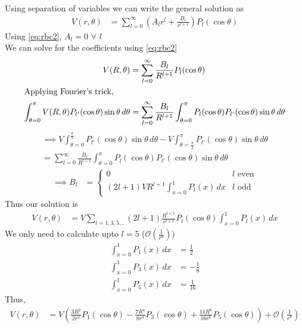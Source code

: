 \documentclass[../main.tex]{subfiles}
\begin{document}
\begin{questions}
\begin{solution}
		Using separation of variables we can write the general solution as
		\begin{align}
			V(r,\theta) &= \sum_{l=0}^{\infty} \left(A_l r^l + \frac{B_l}{r^{l+1}}\right)P_l(\cos\theta)
		\end{align}
		Using \eqref{eq:rbc2}, $A_l = 0$ $\forall$ $l$\\
		We can solve for the coefficients using \eqref{eq:rbc2}
		\begin{align}
			V(R,\theta) &= \sum_{l=0}^{\infty} \frac{B_l}{R^{l+1}}P_l(\cos\theta)\\
			\intertext{Applying Fourier's trick,}
			\int_{\theta=0}^{\pi} V(R,\theta)P_{l'}(\cos\theta)\sin\theta\,d\theta &= \sum_{l=0}^{\infty} \frac{B_l}{R^{l+1}} \int_{\theta=0}^{\pi} P_l(\cos\theta)P_{l'}(\cos\theta)\sin\theta\,d\theta
		\end{align}
		\begin{align}
			\implies V\int_{\theta=0}^{\frac{\pi}{2}} P_{l'}(\cos\theta)\sin\theta\,d\theta - V\int_{\theta=\frac{\pi}{2}}^{\pi} P_{l'}(\cos\theta)\sin\theta\,d\theta \\
			= \sum_{l=0}^{\infty} \frac{B_l}{R^{l+1}} \int_{\theta=0}^{\pi} P_l(\cos\theta)P_{l'}(\cos\theta)\sin\theta\,d\theta
		\end{align}
		\begin{align}
			\implies B_l &=
			\begin{cases}
				0 & l \text{ even}\\
				(2l+1)VR^{l+1} \int_{x=0}^{1}P_l(x)\,dx & l \text{ odd}
			\end{cases}
		\end{align}
		Thus our solution is
		\begin{align}
			V(r,\theta) &= V\sum_{l=1,3,5\dots} (2l+1)\frac{R^{l+1}}{r^{l+1}} P_l(\cos\theta)\int_{x=0}^{1}P_l(x)\,dx
		\end{align}
		We only need to calculate upto $l=5$ ($\mathcal{O}(\frac{1}{r^6})$)
		\begin{align}
			\int_{x=0}^{1} P_1(x)\,dx &= \frac{1}{2}\\
			\int_{x=0}^{1} P_3(x)\,dx &= -\frac{1}{8}\\
			\int_{x=0}^{1} P_5(x)\,dx &= \frac{1}{16}
		\end{align}
		Thus,
		\begin{align}
			V(r,\theta) &= V\left(\frac{3R^2}{2r^2}P_1(\cos\theta)-\frac{7R^4}{8r^4}P_3(\cos\theta)+\frac{11R^6}{16r^6}P_5(\cos\theta)\right) + \mathcal{O}(\frac{1}{r^8})
		\end{align}
	\end{solution}


\end{questions}
\end{document}
